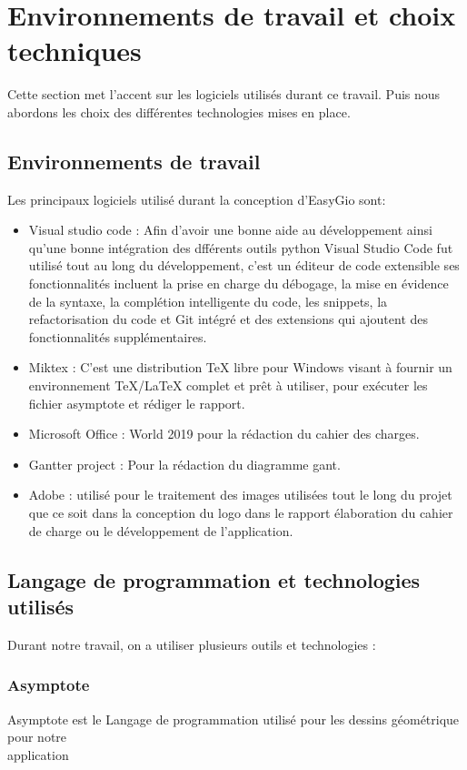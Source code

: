 \documentclass[a4paper]{report}
\begin{document}
\section{Environnements de travail et choix techniques}
Cette section met l’accent sur les logiciels utilisés durant ce travail. Puis nous abordons les choix des différentes technologies mises en place.
\subsection{Environnements de travail}
Les principaux logiciels utilisé durant la conception d'EasyGio sont:
\begin{itemize}
    \item Visual studio code : Afin d’avoir une bonne aide au développement ainsi qu’une bonne intégration des dfférents outils python Visual Studio Code fut utilisé tout au long du développement, c'est un éditeur de code extensible ses fonctionnalités incluent la prise en charge du débogage, la mise en évidence de la syntaxe, la complétion intelligente du code, les snippets, la refactorisation du code et Git intégré et des extensions qui ajoutent des  fonctionnalités supplémentaires.
    \item Miktex : C'est une distribution TeX libre pour Windows visant à fournir un environnement TeX/LaTeX complet et prêt à utiliser, pour exécuter les fichier asymptote et rédiger le rapport.
    \item Microsoft Office : World 2019 pour la rédaction du cahier des charges.
    \item Gantter project : Pour la rédaction du diagramme gant.
    \item Adobe : utilisé pour le traitement des images utilisées tout le long du projet que ce soit dans la conception du logo dans le rapport élaboration du cahier de charge ou le développement de l’application.
\end{itemize}
\subsection{Langage de programmation et technologies utilisés}
Durant notre travail, on a utiliser plusieurs outils et technologies :
\subsubsection{Asymptote}
Asymptote est le Langage de programmation utilisé pour les dessins géométrique pour notre \\application 
\end{document}
